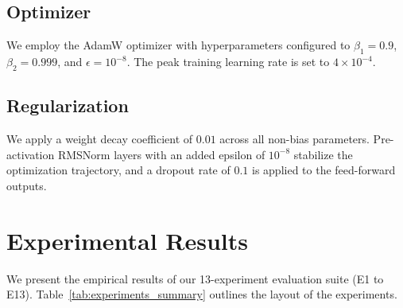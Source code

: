 \documentclass{article}
\begin{document}
\subsection{Optimizer}
We employ the AdamW optimizer with hyperparameters configured to $\beta_1=0.9$, $\beta_2=0.999$, and $\epsilon=10^{-8}$. The peak training learning rate is set to $4 \times 10^{-4}$.

\subsection{Regularization}
We apply a weight decay coefficient of $0.01$ across all non-bias parameters. Pre-activation RMSNorm layers with an added epsilon of $10^{-8}$ stabilize the optimization trajectory, and a dropout rate of $0.1$ is applied to the feed-forward outputs.

\section{Experimental Results}
\label{sec:results}

We present the empirical results of our 13-experiment evaluation suite (E1 to E13). Table~\ref{tab:experiments_summary} outlines the layout of the experiments.
\end{document}
